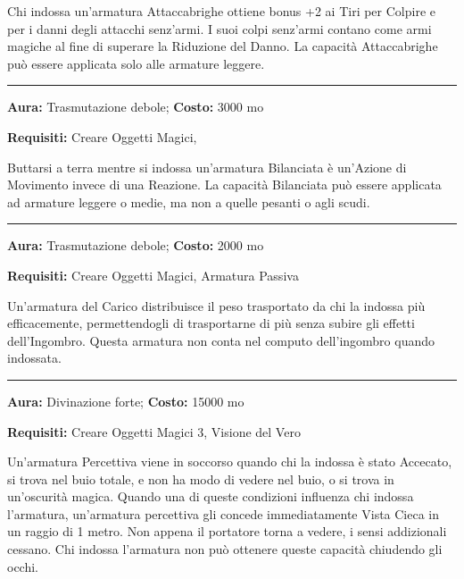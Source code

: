 \documentclass[a4paper,twoside,openany]{book}
\begin{document}
Chi indossa un'armatura Attaccabrighe ottiene bonus +2 ai Tiri per Colpire e per i danni degli attacchi senz'armi. I suoi colpi senz'armi contano come armi magiche al fine di superare la Riduzione del Danno. La capacità Attaccabrighe può essere applicata solo alle armature leggere.

\smallskip\noindent\rule{\linewidth}{2pt}  \hypertarget{Bilanciata}{}\medskip{}\noindent\label{Bilanciata}

\textbf{Aura:} Trasmutazione debole; \textbf{Costo:} 3000 mo

\textbf{Requisiti:} Creare Oggetti Magici,


Buttarsi a terra mentre si indossa un'armatura Bilanciata è un'Azione di Movimento invece di una Reazione. La capacità Bilanciata può essere applicata ad armature leggere o medie, ma non a quelle pesanti o agli scudi.


\smallskip\noindent\rule{\linewidth}{2pt}  \hypertarget{Carico}{}\medskip{}\noindent\label{Carico}

\textbf{Aura:} Trasmutazione debole; \textbf{Costo:} 2000 mo

\textbf{Requisiti:} Creare Oggetti Magici, Armatura Passiva


Un'armatura del Carico distribuisce il peso trasportato da chi la indossa più efficacemente, permettendogli di trasportarne di più senza subire gli effetti dell'Ingombro. Questa armatura non conta nel computo dell'ingombro quando indossata.


\smallskip\noindent\rule{\linewidth}{2pt}  \hypertarget{Percettiva}{}\medskip{}\noindent\label{Percettiva}

\textbf{Aura:} Divinazione forte; \textbf{Costo:} 15000 mo

\textbf{Requisiti:} Creare Oggetti Magici 3, Visione del Vero


Un'armatura Percettiva viene in soccorso quando chi la indossa è stato Accecato, si trova nel buio totale, e non ha modo di vedere nel buio, o si trova in un'oscurità magica. Quando una di queste condizioni influenza chi indossa l'armatura, un'armatura percettiva gli concede immediatamente Vista Cieca in un raggio di 1 metro. Non appena il portatore torna a vedere, i sensi addizionali cessano. Chi indossa l'armatura non può ottenere queste capacità chiudendo gli occhi.
\end{document}

